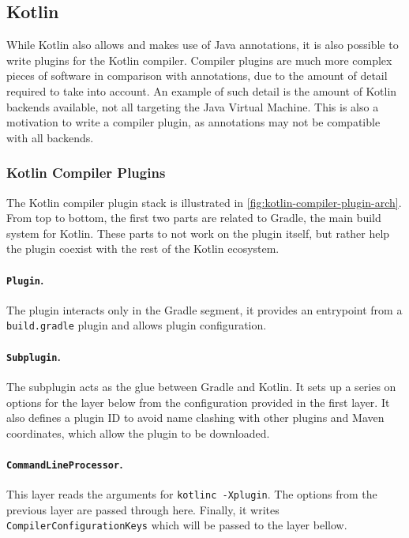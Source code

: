 \subsection{Kotlin}\label{sec:lang-preprocessors:kotlin}

While Kotlin also allows and makes use of Java annotations, it is also possible to write plugins for the Kotlin compiler.
Compiler plugins are much more complex pieces of software in comparison with annotations,
due to the amount of detail required to take into account.
An example of such detail is the amount of Kotlin backends available, not all targeting the Java Virtual Machine.
This is also a motivation to write a compiler plugin, as annotations may not be compatible with all backends.

\subsubsection*{Kotlin Compiler Plugins}\label{sec:lang-preprocessors:kotlin:annotation}
The Kotlin compiler plugin stack is illustrated in \autoref{fig:kotlin-compiler-plugin-arch}.
From top to bottom, the first two parts are related to Gradle, the main build system for Kotlin.
These parts to not work on the plugin itself, but rather help the plugin coexist with the rest of the Kotlin ecosystem.

\paragraph{\texttt{Plugin}.}
The plugin interacts only in the Gradle segment,
it provides an entrypoint from a \texttt{build.gradle} plugin and allows plugin configuration.

\paragraph{\texttt{Subplugin}.}
The subplugin acts as the glue between Gradle and Kotlin.
It sets up a series on options for the layer below from the configuration provided in the first layer.
It also defines a plugin ID to avoid name clashing with other plugins and Maven coordinates, which allow the plugin to be downloaded.

\paragraph{\texttt{CommandLineProcessor}.}
This layer reads the arguments for \texttt{kotlinc -Xplugin}.
The options from the previous layer are passed through here.
Finally, it writes \texttt{CompilerConfigurationKeys} which will be passed to the layer bellow.

